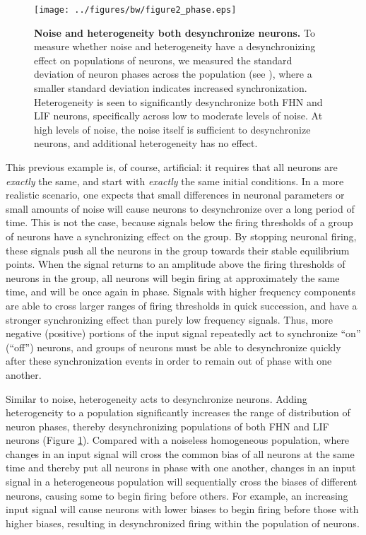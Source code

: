 \documentclass[12pt]{article}
\newcommand{\fig}[1]{Figure \ref{fig:#1}}
\newcommand{\figlabel}[1]{\label{fig:#1}}
\newcommand{\scn}[1]{\textsc{\nameref{scn:#1}}}
\begin{document}
\begin{figure}
  \ifx\hidefigures\undefined
    \centering
    \texttt{[image: ../figures/bw/figure2\_phase.eps]}
  \fi
  \caption{
    \textbf{Noise and heterogeneity both desynchronize neurons.} To measure whether noise and heterogeneity have a desynchronizing effect on populations of neurons, we measured the standard deviation of neuron phases across the population (see \scn{methods}), where a smaller standard deviation indicates increased synchronization. Heterogeneity is seen to significantly desynchronize both FHN and LIF neurons, specifically across low to moderate levels of noise. At high levels of noise, the noise itself is sufficient to desynchronize neurons, and additional heterogeneity has no effect.
  }
  \figlabel{phase}
\end{figure}

This previous example is, of course, artificial: it requires that all neurons are \emph{exactly} the same, and start with \emph{exactly} the same initial conditions. In a more realistic scenario, one expects that small differences in neuronal parameters or small amounts of noise will cause neurons to desynchronize over a long period of time. This is not the case, because signals below the firing thresholds of a group of neurons have a synchronizing effect on the group. By stopping neuronal firing, these signals push all the neurons in the group towards their stable equilibrium points. When the signal returns to an amplitude above the firing thresholds of neurons in the group, all neurons will begin firing at approximately the same time, and will be once again in phase. Signals with higher frequency components are able to cross larger ranges of firing thresholds in quick succession, and have a stronger synchronizing effect than purely low frequency signals. Thus, more negative (positive) portions of the input signal repeatedly act to synchronize ``on'' (``off'') neurons, and groups of neurons must be able to desynchronize quickly after these synchronization events in order to remain out of phase with one another.

Similar to noise, heterogeneity acts to desynchronize neurons. Adding heterogeneity to a population significantly increases the range of distribution of neuron phases, thereby desynchronizing populations of both FHN and LIF neurons (\fig{phase}). Compared with a noiseless homogeneous population, where changes in an input signal will cross the common bias of all neurons at the same time and thereby put all neurons in phase with one another, changes in an input signal in a heterogeneous population will sequentially cross the biases of different neurons, causing some to begin firing before others. For example, an increasing input signal will cause neurons with lower biases to begin firing before those with higher biases, resulting in desynchronized firing within the population of neurons.
\end{document}

